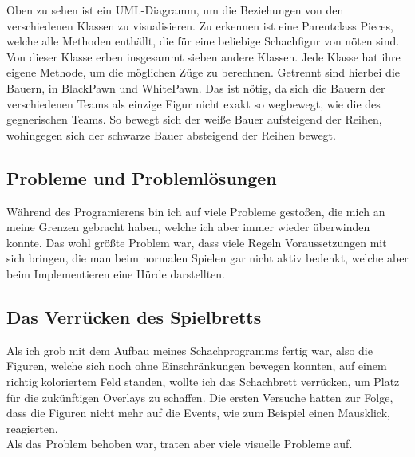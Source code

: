 \documentclass[a4paper, 10pt]{scrartcl}
\begin{document}
Oben zu sehen ist ein UML-Diagramm, um die Beziehungen von den verschiedenen
Klassen zu visualisieren. Zu erkennen ist eine Parentclass \glqq{}Pieces\grqq ,
welche alle Methoden enthällt, die für eine beliebige Schachfigur von nöten sind.
Von dieser Klasse erben insgesammt sieben andere Klassen. Jede Klasse hat ihre eigene
Methode, um die möglichen Züge zu berechnen. Getrennt sind hierbei die Bauern, in
BlackPawn und WhitePawn. Das ist nötig, da sich die Bauern der verschiedenen Teams als
einzige Figur nicht exakt so wegbewegt, wie die des gegnerischen Teams. So bewegt sich
der weiße Bauer aufsteigend der Reihen, wohingegen sich der schwarze Bauer absteigend der
Reihen bewegt. 

\subsection{Probleme und Problemlösungen}
Während des Programierens bin ich auf viele Probleme gestoßen, die mich an meine Grenzen gebracht haben, welche ich aber immer wieder überwinden konnte.
Das wohl größte Problem war, dass viele Regeln Voraussetzungen mit sich bringen, die man beim normalen Spielen gar nicht aktiv bedenkt, welche aber
beim Implementieren eine Hürde darstellten.

\subsection{Das Verrücken des Spielbretts}
Als ich grob mit dem Aufbau meines Schachprogramms
fertig war, also die Figuren, welche sich noch ohne
Einschränkungen bewegen konnten, auf einem richtig koloriertem
Feld standen, wollte ich das Schachbrett verrücken, um Platz für
die zukünftigen Overlays zu schaffen.
Die ersten Versuche hatten zur Folge, dass die Figuren nicht mehr auf die
Events, wie zum Beispiel einen Mausklick, reagierten.\\
Als das Problem behoben war, traten aber viele visuelle Probleme auf.
\end{document}
